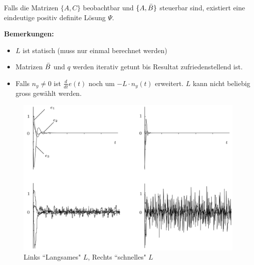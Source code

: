             Falls die Matrizen $\{A,C\}$ beobachtbar und $\{A,\Bar{B}\}$ steuerbar sind, existiert eine eindeutige positiv definite Lösung $\Psi$.
            
            \textbf{Bemerkungen:}
            \begin{itemize}
                \item $L$ ist statisch (muss nur einmal berechnet werden)
                \item Matrizen $\Bar{B}$ und $q$ werden iterativ getunt bis Resultat zufriedenstellend ist.
                \item Falls $n_y\neq0$ ist $\frac{d}{dt}e(t)$ noch um $-L\cdot n_y(t)$ erweitert. $L$ kann nicht beliebig gross gewählt werden.
            \end{itemize}
            
            \begin{figure}[H]
                \centering
                \includegraphics[width = 0.7\linewidth]{images/09/L_noise.jpeg}
                \caption{Links ``Langsames" $L$, Rechts ``schnelles" $L$}
            \end{figure}